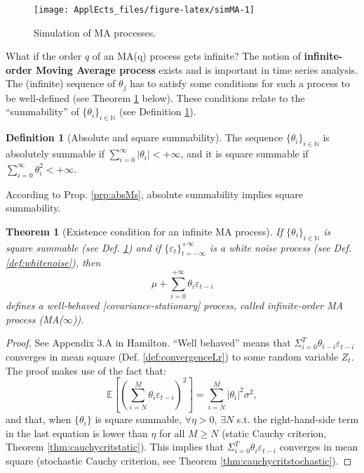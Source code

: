 \documentclass[
  12pt,
]{book}
\newtheorem{theorem}{Theorem}[chapter]
\theoremstyle{definition}
\newtheorem{definition}{Definition}[chapter]
\theoremstyle{definition}
\theoremstyle{definition}
\theoremstyle{definition}
\theoremstyle{remark}
\begin{document}
\begin{figure}
\texttt{[image: ApplEcts\_files/figure-latex/simMA-1]} \caption{Simulation of MA processes.}\label{fig:simMA}
\end{figure}

What if the order \(q\) of an MA(q) process gets infinite? The notion of \textbf{infinite-order Moving Average process} exists and is important in time series analysis. The (infinite) sequence of \(\theta_j\) has to satisfy some conditions for such a process to be well-defined (see Theorem \ref{thm:infMA} below). These conditions relate to the ``summability'' of \(\{\theta_{i}\}_{i\in\mathbb{N}}\) (see Definition \ref{def:summability}).

\begin{definition}[Absolute and square summability]
\protect\hypertarget{def:summability}{}\label{def:summability}The sequence \(\{\theta_{i}\}_{i\in\mathbb{N}}\) is absolutely summable if \(\sum_{i=0}^{\infty}|\theta_i| < + \infty\), and it is square summable if \(\sum_{i=0}^{\infty} \theta_i^2 < + \infty\).
\end{definition}

According to Prop. \ref{prp:absMs}, absolute summability implies square summability.

\begin{theorem}[Existence condition for an infinite MA process]
\protect\hypertarget{thm:infMA}{}\label{thm:infMA}If \(\{\theta_{i}\}_{i\in\mathbb{N}}\) is square summable (see Def. \ref{def:summability}) and if \(\{\varepsilon_t\}_{t = -\infty}^{+\infty}\) is a white noise process (see Def. \ref{def:whitenoise}), then
\[
\mu + \sum_{i=0}^{+\infty} \theta_{i} \varepsilon_{t-i}
\]
defines a well-behaved {[}covariance-stationary{]} process, called infinite-order MA process (MA(\(\infty\))).
\end{theorem}

\begin{proof}
See Appendix 3.A in Hamilton. ``Well behaved'' means that \(\Sigma_{i=0}^{T} \theta_{t-i} \varepsilon_{t-i}\) converges in mean square (Def. \ref{def:convergenceLr}) to some random variable \(Z_t\). The proof makes use of the fact that:
\[
\mathbb{E}\left[\left(\sum_{i=N}^{M}\theta_{i} \varepsilon_{t-i}\right)^2\right] = \sum_{i=N}^{M}|\theta_{i}|^2 \sigma^2,
\]
and that, when \(\{\theta_{i}\}\) is square summable, \(\forall \eta>0\), \(\exists N\) s.t. the right-hand-side term in the last equation is lower than \(\eta\) for all \(M \ge N\) (static Cauchy criterion, Theorem \ref{thm:cauchycritstatic}). This implies that \(\Sigma_{i=0}^{T} \theta_{i} \varepsilon_{t-i}\) converges in mean square (stochastic Cauchy criterion, see Theorem \ref{thm:cauchycritstochastic}).
\end{proof}
\end{document}
